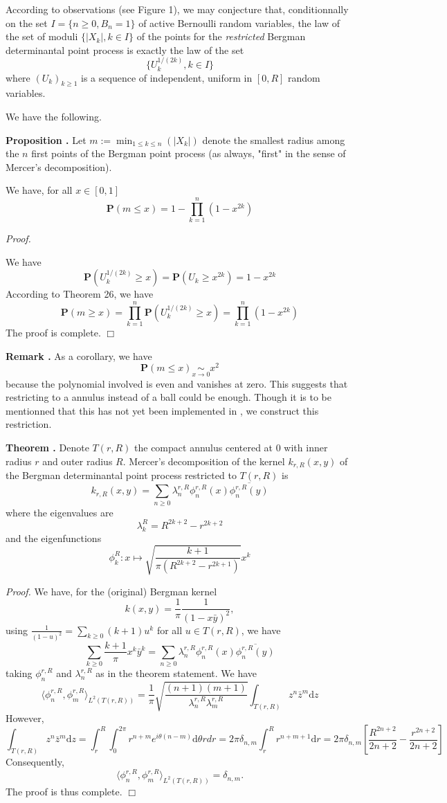 \documentclass[11pt]{article}
\newcommand{\qed}{\hfill$\Box$}
\newcounter{cnt}
\newcommand{\cnt}{\thecnt \stepcounter{cnt}}
\begin{document}
According to observations (see Figure 1), we may conjecture that, conditionnally on the set $I = \{n \ge 0, B_n = 1\}$ of active Bernoulli random variables, the law of the set of moduli $\{|X_k|, k \in I\}$ of the points for the \textit{restricted} Bergman determinantal point process is exactly the law of the set
\[
\{U_k^{1/(2k)}, k \in I\}
\]
where $(U_k)_{k \ge 1}$ is a sequence of independent, uniform in $[0, R]$ random variables.

We have the following.

\textbf{Proposition \cnt.} Let $m := \min_{1 \le k \le n} (|X_k|)$ denote the smallest radius among the $n$ first points of the Bergman point process (as always, "first" in the sense of Mercer's decomposition).

We have, for all $x \in [0,1]$
\[
\mathbf{P}(m \le x) = 1 - \prod_{k=1}^n (1 - x^{2k})
\]

\textit{Proof.}

We have
\[
\mathbf{P}(U_k^{1/(2k)} \ge x) = \mathbf{P}(U_k \ge x^{2k}) = 1 - x^{2k}
\]
According to Theorem 26, we have
\[
\mathbf{P}(m \ge x) = \prod_{k=1}^n \mathbf{P}(U_k^{1/(2k)} \ge x) = \prod_{k=1}^n (1 - x^{2k})
\]
The proof is complete. \qed

\textbf{Remark \cnt.} As a corollary, we have
\[
\mathbf{P}(m \le x) \underset{x \to 0}{\sim} x^2
\]
because the polynomial involved is even and vanishes at zero. This suggests that restricting to a annulus instead of a ball could be enough. Though it is to be mentionned that this has not yet been implemented in \cite{MorozSoftware}, we construct this restriction.

\textbf{Theorem \cnt.} Denote $T(r,R)$ the compact annulus centered at 0 with inner radius $r$ and outer radius $R$. Mercer's decomposition of the kernel $k_{r,R}(x,y)$ of the Bergman determinantal point process restricted to $T(r,R)$ is
\[
k_{r,R}(x,y) = \sum_{n \ge 0} \lambda_n^{r,R} \phi_n^{r,R}(x) \overline{\phi_n^{r,R}(y)}
\]
where the eigenvalues are
\[
\lambda_k^R = R^{2k+2} - r^{2k+2}
\]
and the eigenfunctions
\[
\phi_k^R: x \mapsto \sqrt{\frac{k+1}{\pi(R^{2k+2} - r^{2k+1})}} x^k
\]

\textit{Proof.}
We have, for the (original) Bergman kernel
\[
k(x,y) = \frac{1}{\pi} \frac{1}{(1-x\bar{y})^2},
\]
using $\frac{1}{(1-u)^2} = \sum_{k \ge 0} (k+1)u^k$ for all $u \in T(r,R)$, we have
\[
\sum_{k \ge 0} \frac{k+1}{\pi} x^k \bar{y}^k = \sum_{n \ge 0} \lambda_n^{r,R} \phi_n^{r,R}(x) \overline{\phi_n^{r,R}(y)}
\]
taking $\phi_n^{r,R}$ and $\lambda_n^{r,R}$ as in the theorem statement. We have
\[
\langle \phi_n^{r,R}, \phi_m^{r,R} \rangle_{L^2(T(r,R))} = \frac{1}{\pi} \sqrt{\frac{(n+1)(m+1)}{\lambda_n^{r,R} \lambda_m^{r,R}}} \int_{T(r,R)} z^n \bar{z}^m \mathrm dz
\]
However,
\[
\int_{T(r,R)} z^n \bar{z}^m \mathrm dz = \int_r^R \int_0^{2\pi} r^{n+m} e^{i\theta(n-m)} \mathrm d\theta rdr = 2\pi \delta_{n,m} \int_r^R r^{n+m+1} \mathrm dr = 2\pi \delta_{n,m} \left[ \frac{R^{2n+2}}{2n+2} - \frac{r^{2n+2}}{2n+2} \right]
\]
Consequently,
\[
\langle \phi_n^{r,R}, \phi_m^{r,R} \rangle_{L^2(T(r,R))} = \delta_{n,m}.
\]
The proof is thus complete. \qed
\end{document}
